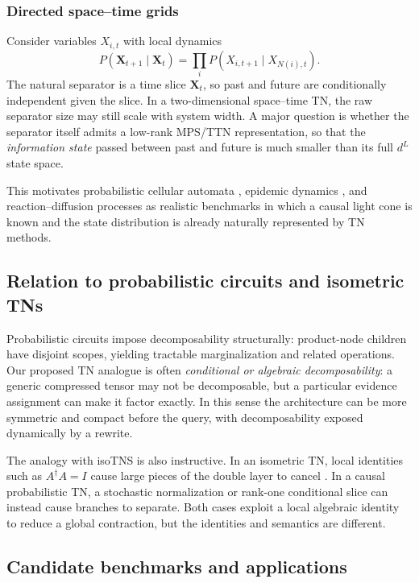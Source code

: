 \documentclass[11pt]{article}
\theoremstyle{remark}
\begin{document}
\subsubsection{Directed space--time grids}

Consider variables $X_{i,t}$ with local dynamics
\begin{equation}
P(\bm X_{t+1}\mid\bm X_t)=\prod_i P(X_{i,t+1}\mid X_{N(i),t}).
\end{equation}
The natural separator is a time slice $\bm X_t$, so past and future are conditionally independent given the slice. In a two-dimensional space--time TN, the raw separator size may still scale with system width. A major question is whether the separator itself admits a low-rank MPS/TTN representation, so that the \emph{information state} passed between past and future is much smaller than its full $d^L$ state space.

This motivates probabilistic cellular automata \cite{casagrande2024pca}, epidemic dynamics \cite{merbis2023epidemic}, and reaction--diffusion processes \cite{nicholson2023rare} as realistic benchmarks in which a causal light cone is known and the state distribution is already naturally represented by TN methods.

\subsection{Relation to probabilistic circuits and isometric TNs}

Probabilistic circuits impose decomposability structurally: product-node children have disjoint scopes, yielding tractable marginalization and related operations. Our proposed TN analogue is often \emph{conditional or algebraic decomposability}: a generic compressed tensor may not be decomposable, but a particular evidence assignment can make it factor exactly. In this sense the architecture can be more symmetric and compact before the query, with decomposability exposed dynamically by a rewrite.

The analogy with isoTNS is also instructive. In an isometric TN, local identities such as $A^\dagger A=I$ cause large pieces of the double layer to cancel \cite{zaletel2020isometric,yu2024dual}. In a causal probabilistic TN, a stochastic normalization or rank-one conditional slice can instead cause branches to separate. Both cases exploit a local algebraic identity to reduce a global contraction, but the identities and semantics are different.

\subsection{Candidate benchmarks and applications}
\end{document}
